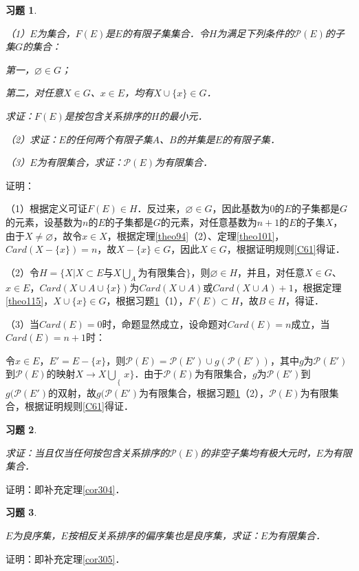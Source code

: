 \documentclass[12pt, a4paper, oneside]{book}
\newtheorem{exer}{习题}
\begin{document}
			\begin{exer}\label{exer127}
				\hfill\par
				（1）$E$为集合，$F(E)$是$E$的有限子集集合．令$H$为满足下列条件的$\mathcal{P}(E)$的子集$G$的集合：
				\par
				第一，$\varnothing\in G$；
				\par
				第二，对任意$X\in G$、$x\in E$，均有$X\cup\{x\}\in G$．
				\par
				求证：$F(E)$是按包含关系排序的$H$的最小元．
				\par
				（2）求证：$E$的任何两个有限子集$A$、$B$的并集是$E$的有限子集．
				\par
				（3）$E$为有限集合，求证：$\mathcal{P}(E)$为有限集合．
			\end{exer}
			证明：
			\par
			（1）根据定义可证$F(E)\in H$．反过来，$\varnothing\in G$，因此基数为$0$的$E$的子集都是$G$的元素，设基数为$n$的$E$的子集都是$G$的元素，对任意基数为$n+1$的$E$的子集$X$，由于$X\neq \varnothing$，故令$x\in X$，根据定理\ref{theo94}（2）、定理\ref{theo101}，$Card(X-\{x\})=n$，故$X-\{x\}\in G$，因此$X\in G$，根据证明规则\ref{C61}得证．
			\par
			（2）令$H=\{X|X\subset E\text{与}X\bigcup\limits_A\text{为有限集合}\}$，则$\varnothing\in H$，并且，对任意$X\in G$、$x\in E$，$Card(X\cup A\cup\{x\})$为$Card(X\cup A)$或$Card(X\cup A)+1$，根据定理\ref{theo115}，$X\cup\{x\}\in G$，根据习题\ref{exer127}（1），$F(E)\subset H$，故$B\in H$，得证．
			\par
			（3）当$Card(E)=0$时，命题显然成立，设命题对$Card(E)=n$成立，当$Card(E)=n+1$时：
			\par
			令$x\in E$，$E'=E-\{x\}$，则$\mathcal{P}(E)=\mathcal{P}(E')\cup g(\mathcal{P}(E'))$，其中$g$为$\mathcal{P}(E')$到$\mathcal{P}(E)$的映射$X\to X\bigcup\limits_\{x\}$．由于$\mathcal{P}(E)$为有限集合，$g$为$\mathcal{P}(E')$到$g(\mathcal{P}(E')$的双射，故$g(\mathcal{P}(E')$为有限集合，根据习题\ref{exer127}（2），$\mathcal{P}(E)$为有限集合，根据证明规则\ref{C61}得证．
			
			\begin{exer}\label{exer128}
				\hfill\par
				求证：当且仅当任何按包含关系排序的$\mathcal{P}(E)$的非空子集均有极大元时，$E$为有限集合．
			\end{exer}
			证明：即补充定理\ref{cor304}．
			
			\begin{exer}\label{exer129}
				\hfill\par
				$E$为良序集，$E$按相反关系排序的偏序集也是良序集，求证：$E$为有限集合．
			\end{exer}
			证明：即补充定理\ref{cor305}．
			
\end{document}
